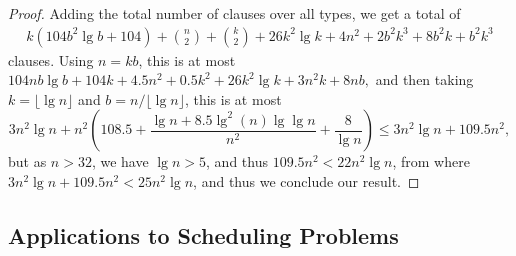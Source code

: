\documentclass[11pt]{article}
\begin{document}
\begin{proof}
    Adding the total number of clauses over all types, we get a total of
    \begin{align*}
        k(104b^2 \lg b + 104) + \binom{n}{2} + \binom{k}{2} + 26k^2 \lg k + 4n^2 + 2b^2k^3 + 8b^2k + b^2k^3 
    \end{align*}
    clauses. Using $n = kb$, this is at most
    \(
        104nb \lg b  + 104k + 4.5n^2 + 0.5k^2 + 26k^2 \lg k + 3n^2k + 8nb,
    \)
    and then taking $k = \lfloor\lg n\rfloor$ and $b = n/\lfloor\lg n\rfloor$, this is at most
    \[
        3n^2\lg n + n^2\left(108.5 + \frac{\lg n + 8.5\lg^2(n) \lg\lg n}{n^2} + \frac{8}{\lg n}\right) \leq 3n^2\lg n + 109.5n^2 \tag{since $n \geq 32$},  %
    \]
    but as $n > 32$, we have $\lg n > 5$, and thus $109.5n^2 < 22n^2 \lg n$, from where $3n^2 \lg n + 109.5n^2 < 25n^2\lg n$, and thus we conclude our result.
\end{proof}

\subsection{Applications to Scheduling Problems}\label{subsec:applications}
\end{document}
